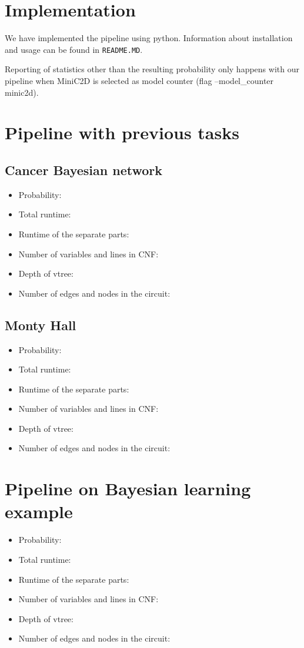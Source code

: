 \section{Implementation}
We have implemented the pipeline using python. Information about installation and usage can be found in \texttt{README.MD}.

Reporting of statistics other than the resulting probability only happens with our pipeline when MiniC2D is selected as model counter (flag --model_counter minic2d).

\section{Pipeline with previous tasks}
\subsection{Cancer Bayesian network}
\begin{itemize}
    \item Probability:
    \item Total runtime:
    \item Runtime of the separate parts:
    \item Number of variables and lines in CNF:
    \item Depth of vtree:
    \item Number of edges and nodes in the circuit:
\end{itemize}
\subsection{Monty Hall}
\begin{itemize}
    \item Probability:
    \item Total runtime:
    \item Runtime of the separate parts:
    \item Number of variables and lines in CNF:
    \item Depth of vtree:
    \item Number of edges and nodes in the circuit:
\end{itemize}

\section{Pipeline on Bayesian learning example}
\begin{itemize}
    \item Probability:
    \item Total runtime:
    \item Runtime of the separate parts:
    \item Number of variables and lines in CNF:
    \item Depth of vtree:
    \item Number of edges and nodes in the circuit:
\end{itemize}

